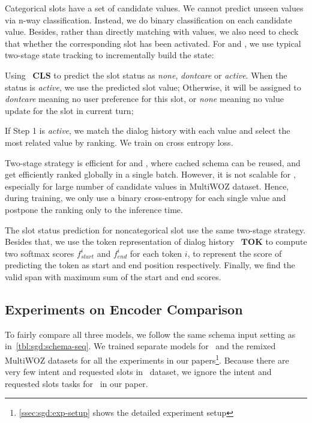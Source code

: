  Categorical slots have a set of candidate
values. We cannot predict unseen values via n-way
classification. Instead, we do binary classification on each candidate
value. Besides, rather than directly matching with values, we also
need to check that whether the corresponding slot has been
activated. For \CE and \FE, we use typical two-stage state tracking to
incrementally build the state:
\begin{inparaenum}[{\bf Step} 1.]
\item Using ~$\mathbf{CLS}$ to predict the slot status as
  \textit{none}, \textit{dontcare} or \textit{active}. When the status is
  \textit{active}, we use the predicted slot value; Otherwise, it
  will be assigned to \textit{dontcare} meaning no user preference for this
  slot, or \textit{none} meaning no value update for the slot in current turn;
\item If Step 1 is \textit{active}, we match the dialog
  history with each value and select the most related value by ranking. We train on cross entropy loss.
\end{inparaenum}
Two-stage strategy is efficient for \DE and \FE, where cached schema
can be reused, and get efficiently ranked globally in a single
batch. However, it is not scalable for \CE, especially for large
number of candidate values in MultiWOZ dataset. Hence, during
training, we only use a binary cross-entropy for each single value and
postpone the ranking only to the inference time.

 The slot status prediction for
noncategorical slot use the same two-stage strategy. Besides that, we
use the token representation of dialog history ~$\mathbf{TOK}$ to
compute two softmax scores $f^{i}_{start}$ and $f^{i}_{end}$ for each
token $i$, to represent the score of predicting the token as start and
end position respectively. Finally, we find the valid span with
maximum sum of the start and end scores.

\subsection{Experiments on Encoder Comparison}
\label{ssec:encoder-results}
To fairly compare all three models, we follow the same schema input
setting as in~\autoref{tbl:sgd:schema-seq}. We trained separate models
for \sgdst~and the remixed MultiWOZ datasets for all the experiments
in our papers\footnote{\autoref{ssec:sgd:exp-setup} shows the detailed
  experiment setup}. Because there are very few intent and requested
slots in \multiwoz~dataset, we ignore the intent and requested slots
tasks for \multiwoz~in our paper.


